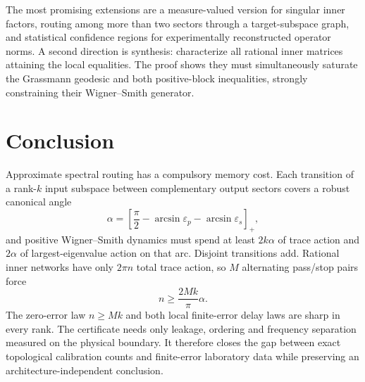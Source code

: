 \documentclass[11pt]{article}
\theoremstyle{definition}
\theoremstyle{remark}
\begin{document}
The most promising extensions are a measure-valued version for singular
inner factors, routing among more than two sectors through a target-subspace
graph, and statistical confidence regions for experimentally reconstructed
operator norms.  A second direction is synthesis: characterize all rational
inner matrices attaining the local equalities.  The proof shows they must
simultaneously saturate the Grassmann geodesic and both positive-block
inequalities, strongly constraining their Wigner--Smith generator.

\section{Conclusion}

Approximate spectral routing has a compulsory memory cost.  Each transition
of a rank-$k$ input subspace between complementary output sectors covers a
robust canonical angle
\[
 \alpha=\left[\frac\pi2-\arcsin\varepsilon_p
                         -\arcsin\varepsilon_s\right]_+,
\]
and positive Wigner--Smith dynamics must spend at least $2k\alpha$ of trace
action and $2\alpha$ of largest-eigenvalue action on that arc.  Disjoint
transitions add.  Rational inner networks have only $2\pi n$ total trace
action, so $M$ alternating pass/stop pairs force
\[
 n\geq\frac{2Mk}{\pi}\alpha.
\]
The zero-error law $n\geq Mk$ and both local finite-error delay laws are
sharp in every rank.  The certificate needs only leakage, ordering and
frequency separation measured on the physical boundary.  It therefore
closes the gap between exact topological calibration counts and finite-error
laboratory data while preserving an architecture-independent conclusion.



\end{document}
